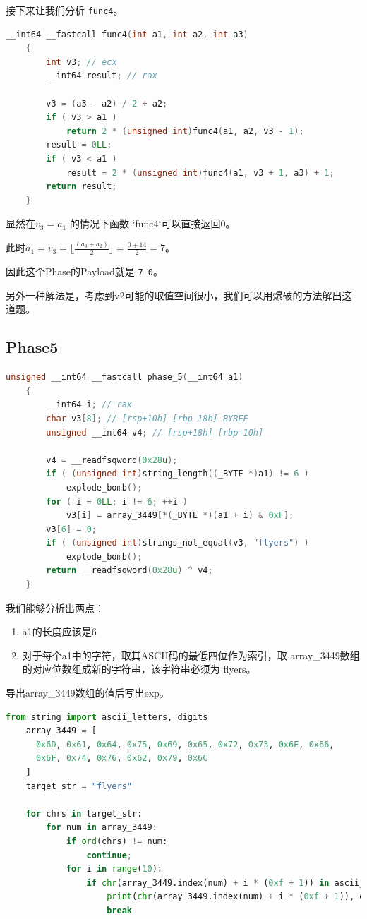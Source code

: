 \documentclass[a4pper,12pt,onecolumn]{article}
\begin{document}
接下来让我们分析 \texttt{func4}。

\begin{lstlisting}[language=c]
    __int64 __fastcall func4(int a1, int a2, int a3)
    {
        int v3; // ecx
        __int64 result; // rax

        v3 = (a3 - a2) / 2 + a2;
        if ( v3 > a1 )
            return 2 * (unsigned int)func4(a1, a2, v3 - 1);
        result = 0LL;
        if ( v3 < a1 )
            result = 2 * (unsigned int)func4(a1, v3 + 1, a3) + 1;
        return result;
    }
\end{lstlisting}

显然在$ v_3=a_1 $ 的情况下函数 `func4`可以直接返回0。

此时$ a_1 = v_3 = \lfloor{\frac{(a_3 + a_2)}{2}}\rfloor=\frac{0+14}{2}=7 $。

因此这个Phase的Payload就是 \texttt{7 0}。

另外一种解法是，考虑到v2可能的取值空间很小，我们可以用爆破的方法解出这道题。

\subsection{Phase5}

\begin{lstlisting}[language=c]
    unsigned __int64 __fastcall phase_5(__int64 a1)
    {
        __int64 i; // rax
        char v3[8]; // [rsp+10h] [rbp-18h] BYREF
        unsigned __int64 v4; // [rsp+18h] [rbp-10h]

        v4 = __readfsqword(0x28u);
        if ( (unsigned int)string_length((_BYTE *)a1) != 6 )
            explode_bomb();
        for ( i = 0LL; i != 6; ++i )
            v3[i] = array_3449[*(_BYTE *)(a1 + i) & 0xF];
        v3[6] = 0;
        if ( (unsigned int)strings_not_equal(v3, "flyers") )
            explode_bomb();
        return __readfsqword(0x28u) ^ v4;
    }
\end{lstlisting}

我们能够分析出两点：

\begin{enumerate}
    \item a1的长度应该是6
    \item 对于每个a1中的字符，取其ASCII码的最低四位作为索引，取 array\_3449数组的对应位数组成新的字符串，该字符串必须为 flyers。
\end{enumerate}

导出array\_3449数组的值后写出exp。

\begin{lstlisting}[language=python]
    from string import ascii_letters, digits
    array_3449 = [
      0x6D, 0x61, 0x64, 0x75, 0x69, 0x65, 0x72, 0x73, 0x6E, 0x66, 
      0x6F, 0x74, 0x76, 0x62, 0x79, 0x6C
    ]
    target_str = "flyers"
    
    for chrs in target_str:
        for num in array_3449:
            if ord(chrs) != num:
                continue;
            for i in range(10):
                if chr(array_3449.index(num) + i * (0xf + 1)) in ascii_letters + digits:
                    print(chr(array_3449.index(num) + i * (0xf + 1)), end="")
                    break
\end{lstlisting}
\end{document}

